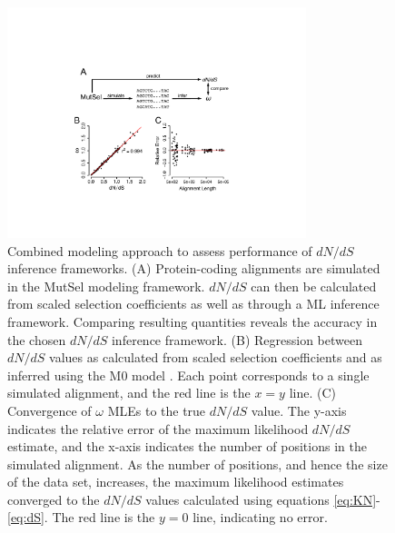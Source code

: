 \documentclass[11pt]{article}
\begin{document}
\begin{figure}[htbp]
	\centerline{\includegraphics[width=8.7cm]{figures/MainText/regression_convergence.pdf}}
	\caption{\label{reg_conv} Combined modeling approach to assess performance of $dN/dS$ inference frameworks. (A) Protein-coding alignments are simulated in the MutSel modeling framework. $dN/dS$ can then be calculated from scaled selection coefficients as well as through a ML inference framework. Comparing resulting quantities reveals the accuracy in the chosen $dN/dS$ inference framework. (B) Regression between $dN/dS$ values as calculated from scaled selection coefficients and as inferred using the M0 model \cite{GoldmanYang1994,NielsenYang1998,Yangetal2000}. Each point corresponds to a single simulated alignment, and the red line is the $x=y$ line. (C) Convergence of $\omega$ MLEs to the true $dN/dS$ value. The y-axis indicates the relative error of the maximum likelihood $dN/dS$ estimate, and the x-axis indicates the number of positions in the simulated alignment. As the number of positions, and hence the size of the data set, increases, the maximum likelihood estimates converged to the $dN/dS$ values calculated using equations \eqref{eq:KN}-\eqref{eq:dS}. The red line is the $y=0$ line, indicating no error.}
\end{figure}
	
\vspace{2cm}
	
\end{document}
